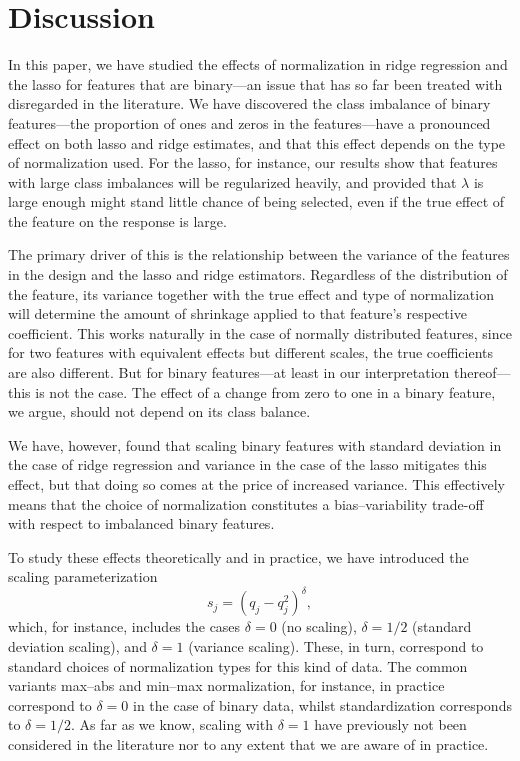 \section{Discussion}\label{sec:discussion}

In this paper, we have studied the effects of normalization in ridge regression and the
lasso for features that are binary---an issue that has so far been treated with disregarded
in the literature. We have discovered the class imbalance of binary features---the
proportion of ones and zeros in the features---have a pronounced effect on both lasso and
ridge estimates, and that this effect depends on the type of normalization used. For the
lasso, for instance, our results show that features with large class imbalances will be
regularized heavily, and provided that \(\lambda\) is large enough might stand little
chance of being selected, even if the true effect of the feature on the response is large.

The primary driver of this is the relationship between the variance of the features in the
design and the lasso and ridge estimators. Regardless of the distribution of the feature,
its variance together with the true effect and type of normalization will determine the
amount of shrinkage applied to that feature's respective coefficient. This works naturally
in the case of normally distributed features, since for two features with equivalent
effects but different scales, the true coefficients are also different. But for binary
features---at least in our interpretation thereof---this is not the case. The effect of a
change from zero to one in a binary feature, we argue, should not depend on its class
balance.

We have, however, found that scaling binary features with standard deviation in the case of
ridge regression and variance in the case of the lasso mitigates this effect, but that
doing so comes at the price of increased variance. This effectively means that the choice
of normalization constitutes a bias--variability trade-off with respect to imbalanced
binary features.

To study these effects theoretically and in practice, we have introduced the scaling
parameterization
\[
  s_j = (q_j - q_j^2)^\delta,
\]
which, for instance, includes the cases \(\delta=0\) (no scaling), \(\delta = 1/2\)
(standard deviation scaling), and \(\delta=1\) (variance scaling). These, in turn,
correspond to standard choices of normalization types for this kind of data. The common
variants max--abs and min--max normalization, for instance, in practice correspond to
\(\delta = 0\) in the case of binary data, whilst standardization corresponds to \(\delta =
1/2\). As far as we know, scaling with \(\delta=1\) have previously not been considered in
the literature nor to any extent that we are aware of in practice.

